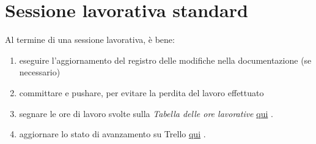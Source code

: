 \chapter{Sessione lavorativa standard}

Al termine di una sessione lavorativa, è bene:
\begin{enumerate}[1.]
\item eseguire l'aggiornamento del registro delle modifiche nella documentazione (se necessario)
\item committare e pushare, per evitare la perdita del lavoro effettuato
\item segnare le ore di lavoro svolte sulla \textit{Tabella delle ore lavorative}
\href{https://docs.google.com/spreadsheets/d/12esX1ISWQOKM-fjuHTLmAzRN0cWltksn7eGiPsBHBI0/edit?usp=sharing}{qui} \cite{TabellaDelleOreLavorative}.
\item aggiornare lo stato di avanzamento su Trello
\href{https://trello.com/b/hIEOGbE9/jawadruids}{qui} \cite{TrelloJawaDruids}.
\end{enumerate}
